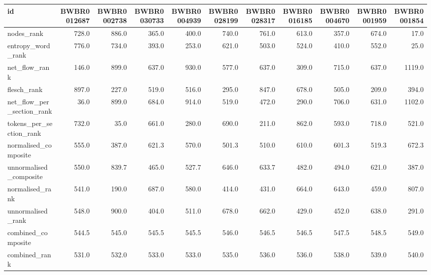 \begin{tabular}{lrrrrrrrrrr}
\toprule
id & BWBR0012687 & BWBR0002738 & BWBR0030733 & BWBR0004939 & BWBR0028199 & BWBR0028317 & BWBR0016185 & BWBR0004670 & BWBR0001959 & BWBR0001854 \\
\midrule
nodes\_rank & 728.0 & 886.0 & 365.0 & 400.0 & 740.0 & 761.0 & 613.0 & 357.0 & 674.0 & 17.0 \\
\cline{1-11}
entropy\_word\_rank & 776.0 & 734.0 & 393.0 & 253.0 & 621.0 & 503.0 & 524.0 & 410.0 & 552.0 & 25.0 \\
\cline{1-11}
net\_flow\_rank & 146.0 & 899.0 & 637.0 & 930.0 & 577.0 & 637.0 & 309.0 & 715.0 & 637.0 & 1119.0 \\
\cline{1-11}
flesch\_rank & 897.0 & 227.0 & 519.0 & 516.0 & 295.0 & 847.0 & 678.0 & 505.0 & 209.0 & 394.0 \\
\cline{1-11}
net\_flow\_per\_section\_rank & 36.0 & 899.0 & 684.0 & 914.0 & 519.0 & 472.0 & 290.0 & 706.0 & 631.0 & 1102.0 \\
\cline{1-11}
tokens\_per\_section\_rank & 732.0 & 35.0 & 661.0 & 280.0 & 690.0 & 211.0 & 862.0 & 593.0 & 718.0 & 521.0 \\
\cline{1-11}
normalised\_composite & 555.0 & 387.0 & 621.3 & 570.0 & 501.3 & 510.0 & 610.0 & 601.3 & 519.3 & 672.3 \\
\cline{1-11}
unnormalised\_composite & 550.0 & 839.7 & 465.0 & 527.7 & 646.0 & 633.7 & 482.0 & 494.0 & 621.0 & 387.0 \\
\cline{1-11}
normalised\_rank & 541.0 & 190.0 & 687.0 & 580.0 & 414.0 & 431.0 & 664.0 & 643.0 & 459.0 & 807.0 \\
\cline{1-11}
unnormalised\_rank & 548.0 & 900.0 & 404.0 & 511.0 & 678.0 & 662.0 & 429.0 & 452.0 & 638.0 & 291.0 \\
\cline{1-11}
combined\_composite & 544.5 & 545.0 & 545.5 & 545.5 & 546.0 & 546.5 & 546.5 & 547.5 & 548.5 & 549.0 \\
\cline{1-11}
combined\_rank & 531.0 & 532.0 & 533.0 & 533.0 & 535.0 & 536.0 & 536.0 & 538.0 & 539.0 & 540.0 \\
\cline{1-11}
\bottomrule
\end{tabular}
